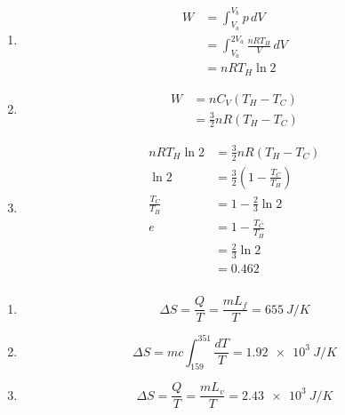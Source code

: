 \documentclass{article}
\begin{document}
\begin{enumerate}
  \item

        \begin{align*}
          W & = \int_{V_a}^{V_b} p \,d V                   \\
            & = \int_{V_a}^{2 V_a} \frac{n R T_H}{V} \,d V \\
            & = n R T_H \ln 2
        \end{align*}

  \item

        \begin{align*}
          W & = n C_V (T_H - T_C)           \\
            & = \frac{3}{2} n R (T_H - T_C)
        \end{align*}

  \item

        \begin{align*}
          n R T_H \ln 2   & = \frac{3}{2} n R (T_H - T_C)                    \\
          \ln 2           & = \frac{3}{2} \left( 1 - \frac{T_C}{T_H} \right) \\
          \frac{T_C}{T_H} & = 1 - \frac{2}{3} \ln 2                          \\
          e               & = 1 - \frac{T_C}{T_H}                            \\
                          & = \frac{2}{3} \ln 2                              \\
                          & = 0.462
        \end{align*}
\end{enumerate}

\subsubsection{}

\begin{enumerate}
  \item \[\Delta S = \frac{Q}{T} = \frac{m L_f}{T} = \qty{655}{J/K}\]

  \item \[\Delta S = m c \int_{159}^{351} \frac{d T}{T} = \qty{1.92e3}{J/K}\]

  \item \[\Delta S = \frac{Q}{T} = \frac{m L_v}{T} = \qty{2.43e3}{J/K}\]
\end{enumerate}
\end{document}
